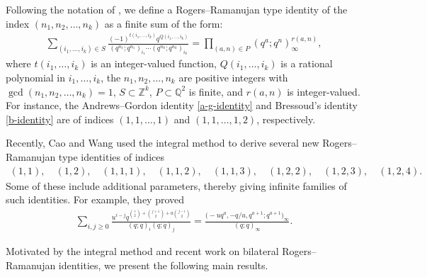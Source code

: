 \documentclass[10pt,a4paper]{amsart}
\numberwithin{equation}{section}
\theoremstyle{definition}
\begin{document}
Following the notation of \cite{Wang-2023}, we define a Rogers--Ramanujan type identity of the index $(n_1,n_2,\dots,n_k)$ as a finite sum of the form:
\begin{align*}
\sum_{(i_1,\dots,i_k)\in S}\frac{(-1)^{t(i_1,\dots,i_k)}q^{Q(i_1,\dots,i_k)}}{(q^{n_1};q^{n_1})_{i_1}\cdots(q^{n_k};q^{n_k})_{i_k}}=\prod_{(a,n)\in P}(q^a;q^n)^{r(a,n)}_{\infty},
\end{align*}
 where $t(i_1, {\dots}, i_k)$ is an integer-valued function, $Q(i_1, {\dots}, i_k)$ is a rational polynomial in $i_1,{\dots},i_k$, the $n_1,n_2,\dots,n_k$ are positive integers with $\gcd(n_1,n_2,\dots,n_k)=1$, $S\subset\mathbb{Z}^k$, $P\subset\mathbb{Q}^2$ is finite, and $r(a,n)$ is integer-valued. For instance, the Andrews--Gordon identity \eqref{a-g-identity} and Bressoud's identity \eqref{b-identity} are of indices $(1,1,\dots,1)$ and $(1,1,\dots,1,2)$, respectively.\par
Recently, Cao and Wang \cite{Cao-2023} used the integral method to derive several new Rogers--Ra\-manu\-jan type identities of indices
\begin{align*}
(1,1), \quad (1,2), \quad (1,1,1), \quad (1,1,2), \quad (1,1,3), \quad (1,2,2), \quad (1,2,3), \quad (1,2,4).
\end{align*}
Some of these include additional parameters, thereby giving infinite families of such identities. For example, they proved \cite[Theorem~3.4]{Cao-2023}
\begin{align}\label{cao-34}
\sum_{i,j\geq0}\frac{u^{i-j}q^{\binom{i}{2}+\binom{j+1}{2}+a\binom{j-i}{2}}}{(q;q)_i(q;q)_j} =\frac{\bigl(-uq^a,-q/u,q^{a+1};q^{a+1}\bigr)_{\infty}}{(q;q)_{\infty}}.
\end{align}

Motivated by the integral method and recent work on bilateral Rogers--Ramanujan identities, we present the following main results.
\end{document}
